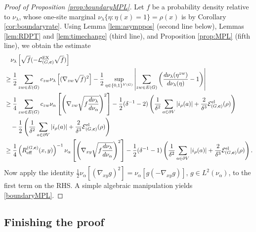 \documentclass[11pt]{amsart}
\theoremstyle{plain}
\theoremstyle{definition}
\theoremstyle{remark}
\begin{document}
\begin{proof}[Proof of Proposition \ref{prop:boundaryMPL}]
Let $f$ be a probability density relative to $\nu_\lambda$, whose one-site marginal $\nu_\lambda\{\eta: \eta(x)=1\}=\rho(x)$ is by Corollary \ref{cor:boundaryrate}.
Using Lemma \ref{lem:asymppos} (second line below), Lemmas  \ref{lem:RDPT} and \ref{lem:timechange} (third line), and Proposition \ref{prop:MPL} (fifth line), we obtain the estimate
\begin{align*}
& \quad \nu_\lambda\left[\sqrt f(-\mathcal{L}^{\rm EX}_{(G,{\bf c})} \sqrt f)\right] \\ 
\nonumber &\geq \frac{1}{2} \sum_{zw\in E(G)} c_{zw} \nu_\lambda\left[(\nabla_{zw} \sqrt{f})^2\right] - \frac{1}{2} \sup_{\eta\in \{0,1\}^{V(G)}}\left|\sum_{zw\in E(G)} \left(\frac{d\nu_\lambda(\eta^{zw})}{d\nu_\lambda (\eta)}-1\right)\right|\\
& \nonumber \geq \frac{1}{4} \sum_{zw\in E(G)} c_{zw} \nu_\alpha\left[\left(\nabla_{zw}\sqrt{f\frac{d\nu_\lambda}{d\nu_\alpha}}\right)^2\right] - \frac{1}{2} (\delta^{-1}-2)\left(\frac{1}{\delta^2} \sum_{a\in \partial V} |i_\rho(a)| + \frac{2}{\delta^3} \mathcal{E}^{\rm el}_{(G,{\bf c})} (\rho) \right) \\
& \nonumber \quad - \frac{1}{2}\left(\frac{1}{\delta^2} \sum_{a\in \partial V} |i_\rho(a)| + \frac{2}{\delta^3} \mathcal{E}^{\rm el}_{(G,{\bf c})} (\rho) \right) \\
& \nonumber \geq \frac{1}{4} \left(R_{\rm eff}^{(G,{\bf c})}(x,y)\right)^{-1} \nu_\alpha\left[\left(\nabla_{xy} \sqrt{f\frac{d\nu_\lambda}{d\nu_\alpha}}\right)^2 \right] - \frac{1}{2}(\delta^{-1}-1)\left(\frac{1}{\delta^2} \sum_{a\in \partial V} |i_\rho(a)| + \frac{2}{\delta^3} \mathcal{E}^{\rm el}_{(G,{\bf c})} (\rho) \right).
\end{align*}
Now apply the identity $\frac{1}{2}\nu_\alpha\left[(\nabla_{xy} g)^2\right] = \nu_\alpha\left[g(-\nabla_{xy} g) \right]$, $g\in L^2(\nu_\alpha)$, to the first term on the RHS. A simple algebraic manipulation yields \eqref{boundaryMPL}.
\end{proof}

\subsection{Finishing the proof} \label{sec:localergodicboundary}
\end{document}
